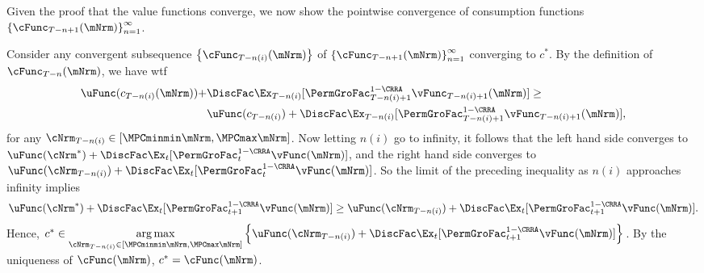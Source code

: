 \documentclass[\econtexRoot/BufferStockTheory]{subfiles}
\begin{document}
Given the proof that the value functions converge, we now show the
pointwise convergence of consumption functions
$\left\{\cFunc_{T-n+1}(\mNrm)\right\} _{n=1}^{\infty }$.

Consider any convergent subsequence $\left\{\cFunc_{T-n(i)}(\mNrm)\right\}$ of $\left\{\cFunc_{T-n+1}(\mNrm)\right\} _{n=1}^{\infty }$ converging to $c^*$. By the definition of $\cFunc_{T-n}(\mNrm)$, we have  wtf
\begin{align}
  \begin{split}
    \uFunc(c_{T - n(i)}(\mNrm)) + & \DiscFac \Ex_{T - n(i)}[{\PermGroFac}_{T-n(i)+1}^{1 - \CRRA}\vFunc_{T-n(i)+1}(\mNrm)]  \geq  \\ & \uFunc(c_{T - n(i)}) + \DiscFac \Ex_{T - n(i)}[{\PermGroFac}_{T-n(i)+1}^{1 - \CRRA}\vFunc_{T-n(i)+1}(\mNrm)], 
    \end{split}
\end{align}
for any $\cNrm_{T - n(i)} \in [\MPCminmin \mNrm,\MPCmax \mNrm]$. Now letting $n(i)$ go to infinity, it follows that the left hand side converges to $\uFunc(\cNrm^*) + \DiscFac \Ex_{t}[{\PermGroFac}_{t}^{1 - \CRRA}\vFunc(\mNrm)]$, and the right hand side converges to $\uFunc(\cNrm_{T - n(i)}) + \DiscFac \Ex_{t}[{\PermGroFac}_{t}^{1 - \CRRA}\vFunc(\mNrm)]$. So the limit of the preceding inequality as $n(i)$ approaches infinity implies 
\begin{equation}
   \uFunc(\cNrm^*) + \DiscFac \Ex_{t}[{\PermGroFac}_{t + 1}^{1 - \CRRA}\vFunc(\mNrm)] \geq \uFunc(\cNrm_{T - n(i)}) + \DiscFac \Ex_{t}[{\PermGroFac}_{t + 1}^{1 - \CRRA}\vFunc(\mNrm)].
\end{equation}
Hence, $c^* \in \underset{\cNrm_{T - n(i)} \in [\MPCminmin \mNrm,\MPCmax \mNrm]}{\arg \max }\left\{ \uFunc(\cNrm_{T - n(i)}) + \DiscFac \Ex_{t}[{\PermGroFac}_{t + 1}^{1 - \CRRA}\vFunc(\mNrm)]\right\}$. By the uniqueness of $\cFunc(\mNrm)$, $c^* = \cFunc(\mNrm)$.
\end{document}
